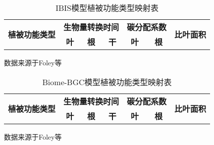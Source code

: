 \begin{table}[!htbp]
    \centering
    \caption{IBIS模型植被功能类型映射表}
    \label{tab:IBIB-PFT-map}
    \begin{threeparttable}
        \begin{tabular}{lcccccc}
            \toprule[1.5pt]
            \multirow{2}{*}{\textbf{植被功能类型}} & \multicolumn{3}{c}{\textbf{生物量转换时间}} & \multicolumn{2}{c}{\textbf{碳分配系数}} & \multirow{2}{*}{\textbf{比叶面积}} \\ 
            \cmidrule(lr){2-4} \cmidrule(lr){5-6}
            & \textbf{叶} & \textbf{根} & \textbf{干} & \textbf{叶} & \textbf{根} &  \\ 
            \midrule[1.5pt]
            \bottomrule[1.5pt]
        \end{tabular}
        \begin{tablenotes}
            \footnotesize
            \item[]数据来源于Foley等~\cite{foley1996integrated}
        \end{tablenotes}
    \end{threeparttable}
\end{table}

\begin{table}[!htbp]
    \centering
    \caption{Biome-BGC模型植被功能类型映射表}
    \label{tab:Biome-BGC-PFT-map}
    \begin{threeparttable}
        \begin{tabular}{lcccccc}
            \toprule[1.5pt] 
            \multirow{2}{*}{\textbf{植被功能类型}} & \multicolumn{3}{c}{\textbf{生物量转换时间}} & \multicolumn{2}{c}{\textbf{碳分配系数}} & \multirow{2}{*}{\textbf{比叶面积}} \\ 
            \cmidrule(lr){2-4} \cmidrule(lr){5-6}
            & \textbf{叶} & \textbf{根} & \textbf{干} & \textbf{叶} & \textbf{根} &  \\ 
            \midrule[1.5pt]
            \bottomrule[1.5pt]
        \end{tabular}
        \begin{tablenotes}
            \footnotesize
            \item[]数据来源于Foley等~\cite{foley1996integrated}
        \end{tablenotes}
    \end{threeparttable}
\end{table}

